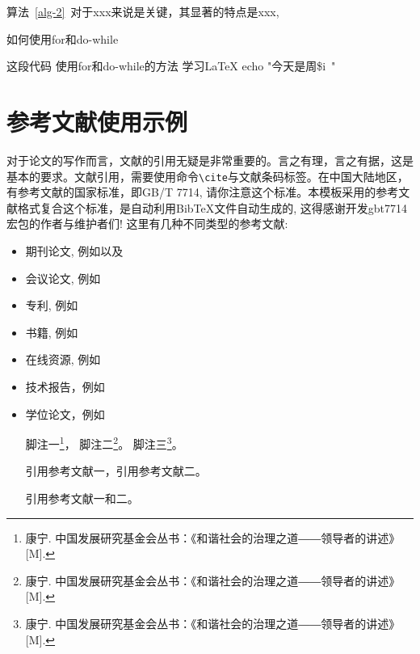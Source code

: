 算法~\ref{alg-2}~对于xxx来说是关键，其显著的特点是xxx, 

\begin{breakablealgorithm}
	\caption{如何使用for和do-while} \label{alg-2}
	\begin{algorithmic}[1]  %
		\Require 这段代码
		\Ensure 使用for和do-while的方法
		\Repeat
		\State 学习\LaTeX
		\State echo "今天是周\$i\ "
		\EndFor
		\EndFunction
	\end{algorithmic}
\end{breakablealgorithm}


\section{参考文献使用示例}

对于论文的写作而言，文献的引用无疑是非常重要的。言之有理，言之有据，这是基本的要求。文献引用，需要使用命令\verb|\cite|与文献条码标签。在中国大陆地区，有参考文献的国家标准，即GB/T 7714, 请你注意这个标准。本模板采用的参考文献格式复合这个标准，是自动利用BibTeX文件自动生成的, 这得感谢开发gbt7714宏包的作者与维护者们! 这里有几种不同类型的参考文献:

\begin{itemize}
\item[\ding{172}] 期刊论文, 例如\cite{XmDeng2007,Brown1984,ZHY2017RS,ZHY2012manifold}以及\cite{Wing2006CT}
\item[\ding{173}] 会议论文, 例如\cite{Geyer1999,Branislav2004}
\item[\ding{174}] 专利, 例如\cite{LongMA2015P}
\item[\ding{175}] 书籍, 例如\cite{CDIO2014,ZHY2022}
\item[\ding{176}] 在线资源, 例如\cite{SFMedu,OpenMVS,HainnuThesis}
\item[\ding{177}] 技术报告，例如\cite{Sussman2005}
\item[\ding{178}] 学位论文，例如\cite{ZHY2002,Xue2006,lzj-zhy-MS-thesis-2018,zls-zhy-MS-thesis-2016,zhy-2011-disertation}


脚注一\footnote{康宁. 中国发展研究基金会丛书：《和谐社会的治理之道――领导者的讲述》[M].}，
脚注二\footnote{康宁. 中国发展研究基金会丛书：《和谐社会的治理之道――领导者的讲述》[M].}。
脚注三\footnote{康宁. 中国发展研究基金会丛书：《和谐社会的治理之道――领导者的讲述》[M].}。

引用参考文献一\cite{gao1987}，引用参考文献二\cite{zhang1989}。

引用参考文献一和二\cite{gao1987,zhang1989}。


\end{itemize}
